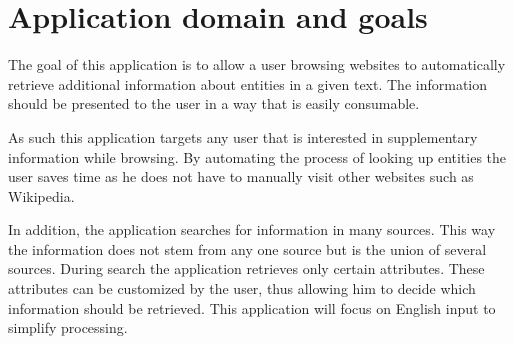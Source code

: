 \section{Application domain and goals}
The goal of this application is to allow a user browsing websites to automatically retrieve additional information about entities in a given text. The information should be presented to the user in a way that is easily consumable. 

As such this application targets any user that is interested in supplementary information while browsing. By automating the process of looking up entities the user saves time as he does not have to manually visit other websites such as Wikipedia. 

In addition, the application searches for information in many sources. This way the information does not stem from any one source but is the union of several sources.  During search the application retrieves only certain attributes. These attributes can be customized by the user, thus allowing him to decide which information should be retrieved. This application will focus on English input to simplify processing.



